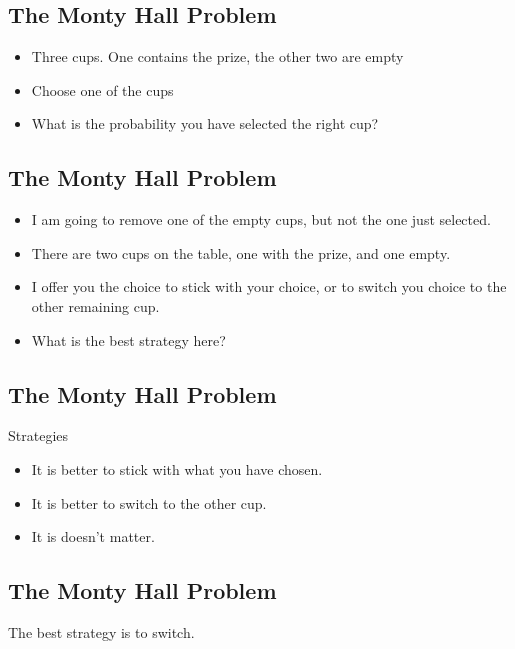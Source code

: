 \documentclass[]{report}
\begin{document}
{
	\subsection{The Monty Hall Problem}
	\begin{itemize} \item Three cups. One contains the prize, the other two are empty
		\item Choose one of the cups
		\item What is the probability you have selected the right cup?
	\end{itemize}
	
}
{
	\subsection{The Monty Hall Problem}
	\begin{itemize} \item I am going to remove one of the empty cups, but not the one just selected.
		\item There are two cups on the table, one with the prize, and one empty.
		\item I offer you the choice to stick with your choice, or to switch you choice to the other remaining cup.
		\item What is the best strategy here?
	\end{itemize}
}
{
	\subsection{The Monty Hall Problem}
	Strategies
	\begin{itemize} \item It is better to stick with what you have chosen.
		\item It is better to switch to the other cup.
		\item It is doesn't matter.
	\end{itemize}
}
{
	\subsection{The Monty Hall Problem}
	
	The best strategy is to switch.
}
\end{document}
